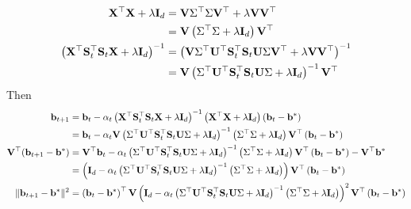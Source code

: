 \documentclass[10pt]{article}
\begin{document}
\begin{align*}
\mathbf{X}^\top\mathbf{X}+\lambda\mathbf{I}_d &= \mathbf{V}\Sigma^\top\Sigma\mathbf{V}^\top + \lambda \mathbf{V}\mathbf{V}^\top \\
&= \mathbf{V}\left(\Sigma^\top\Sigma + \lambda\mathbf{I}_d\right)\mathbf{V}^\top \\
\left(\mathbf{X}^\top\mathbf{S}_t^\top\mathbf{S}_t\mathbf{X} + \lambda\mathbf{I}_d\right)^{-1} &= \left(\mathbf{V}\Sigma^\top\mathbf{U}^\top\mathbf{S}_t^\top\mathbf{S}_t\mathbf{U}\Sigma\mathbf{V}^\top + \lambda\mathbf{V}\mathbf{V}^\top\right)^{-1} \\
&= \mathbf{V}\left(\Sigma^\top\mathbf{U}^\top\mathbf{S}_t^\top\mathbf{S}_t\mathbf{U}\Sigma + \lambda\mathbf{I}_d\right)^{-1}\mathbf{V}^\top
\end{align*}
Then
\begin{align*}
\mathbf{b}_{t+1} &= \mathbf{b}_t - \alpha_t\left(\mathbf{X}^\top\mathbf{S}_t^\top\mathbf{S}_t\mathbf{X} + \lambda\mathbf{I}_d\right)^{-1}\left(\mathbf{X}^\top\mathbf{X}+\lambda\mathbf{I}_d\right)\left(\mathbf{b}_t-\mathbf{b}^*\right) \\
&= \mathbf{b}_t - \alpha_t\mathbf{V}\left(\Sigma^\top\mathbf{U}^\top\mathbf{S}_t^\top\mathbf{S}_t\mathbf{U}\Sigma + \lambda\mathbf{I}_d\right)^{-1}\left(\Sigma^\top\Sigma + \lambda\mathbf{I}_d \right)\mathbf{V}^\top\left(\mathbf{b}_t-\mathbf{b}^*\right) \\
\mathbf{V}^\top(\mathbf{b}_{t+1}-\mathbf{b}^*) &= \mathbf{V}^\top\mathbf{b}_t - \alpha_t\left(\Sigma^\top\mathbf{U}^\top\mathbf{S}_t^\top\mathbf{S}_t\mathbf{U}\Sigma + \lambda\mathbf{I}_d\right)^{-1}\left(\Sigma^\top\Sigma + \lambda\mathbf{I}_d\right)\mathbf{V}^\top\left(\mathbf{b}_t-\mathbf{b}^*\right) - \mathbf{V}^\top\mathbf{b}^* \\
&= \left(\mathbf{I}_d - \alpha_t\left(\Sigma^\top\mathbf{U}^\top\mathbf{S}_t^\top\mathbf{S}_t\mathbf{U}\Sigma + \lambda\mathbf{I}_d\right)^{-1}\left(\Sigma^\top\Sigma + \lambda\mathbf{I}_d\right)\right)\mathbf{V}^\top\left(\mathbf{b}_t-\mathbf{b}^*\right) \\
\|\mathbf{b}_{t+1}-\mathbf{b}^*\|^2 &= \left(\mathbf{b}_t-\mathbf{b}^*\right)^\top\mathbf{V}\left(\mathbf{I}_d - \alpha_t\left(\Sigma^\top\mathbf{U}^\top\mathbf{S}_t^\top\mathbf{S}_t\mathbf{U}\Sigma + \lambda\mathbf{I}_d\right)^{-1}\left(\Sigma^\top\Sigma + \lambda\mathbf{I}_d\right)\right)^2\mathbf{V}^\top \left(\mathbf{b}_t-\mathbf{b}^*\right)
\end{align*}
\end{document}
